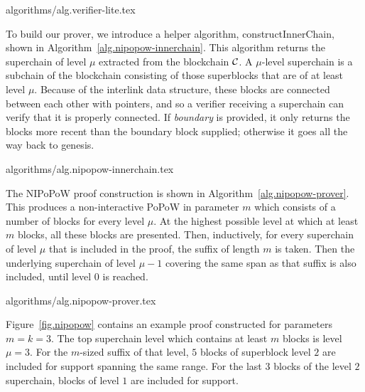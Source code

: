 {algorithms/alg.verifier-lite.tex}

To build our prover, we introduce a helper algorithm, constructInnerChain,
shown in Algorithm~\ref{alg.nipopow-innerchain}. This algorithm returns the
superchain of level $\mu$ extracted from the blockchain $\mathcal{C}$. A
$\mu$-level superchain is a subchain of the blockchain consisting of those
superblocks that are of at least level $\mu$. Because of the interlink data
structure, these blocks are connected between each other with pointers, and so
a verifier receiving a superchain can verify that it is properly connected.
If \textit{boundary} is provided, it only returns the blocks more recent than
the boundary block supplied; otherwise it goes all the way back to genesis.

{algorithms/alg.nipopow-innerchain.tex}

The NIPoPoW proof construction is shown in Algorithm~\ref{alg.nipopow-prover}.
This produces a non-interactive PoPoW in parameter $m$ which consists of a
number of blocks for every level $\mu$. At the highest possible level at which
at least $m$ blocks, all these blocks are presented. Then, inductively, for
every superchain of level $\mu$ that is included in the proof, the suffix of
length $m$ is taken. Then the underlying superchain of level $\mu - 1$ covering
the same span as that suffix is also included, until level $0$ is reached.

{algorithms/alg.nipopow-prover.tex}


Figure~\ref{fig.nipopow} contains an example proof constructed for parameters
$m = k = 3$. The top superchain level which contains at least $m$ blocks is
level $\mu = 3$. For the $m$-sized suffix of that level, $5$ blocks of
superblock level $2$ are included for support spanning the same range. For the
last $3$ blocks of the level $2$ superchain, blocks of level $1$ are included
for support.

